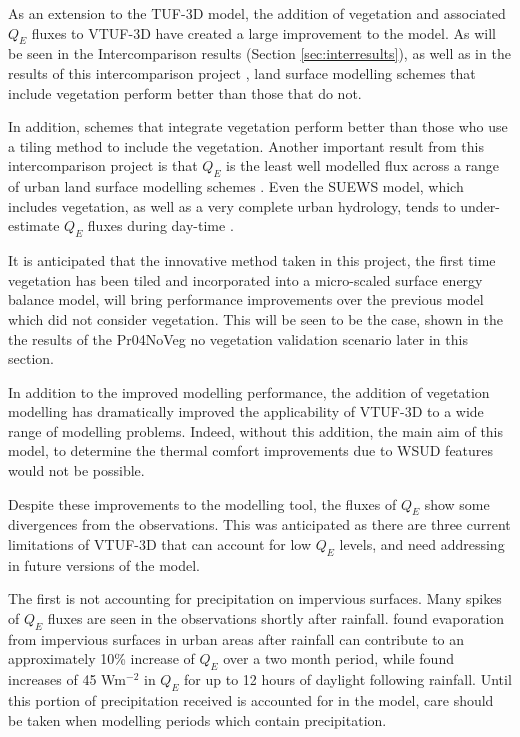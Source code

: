 \documentclass[final,3p,times,authoryear]{elsarticle}
\begin{document}
As an extension to the TUF-3D model, the addition of vegetation and associated $Q_{E}$ fluxes to VTUF-3D have created a large improvement to the model. As will be seen in the Intercomparison results (Section \ref{sec:interresults}), as well as in the results of this intercomparison project \citep{Grimmond2011,Best2012}, land surface modelling schemes that include vegetation perform better than those that do not. 

In addition, schemes that integrate vegetation perform better than those who use a tiling method to include the vegetation. Another important result from this intercomparison project is that $Q_{E}$ is the least well modelled flux across a range of urban land surface modelling schemes \citep{Grimmond2010}. Even the SUEWS model, which includes vegetation, as well as a very complete urban hydrology, tends to under-estimate $Q_{E}$ fluxes during day-time \citep{Jarvi2011}.

It is anticipated that the innovative method taken in this project, the first time vegetation has been tiled and incorporated into a micro-scaled surface energy balance model, will bring performance improvements over the previous model which did not consider vegetation. This will be seen to be the case, shown in the the results of the Pr04NoVeg no vegetation validation scenario later in this section. 

In addition to the improved modelling performance, the addition of vegetation modelling has dramatically improved the applicability of VTUF-3D to a wide range of modelling problems. Indeed, without this addition, the main aim of this model, to determine the thermal comfort improvements due to WSUD features would not be possible. 

Despite these improvements to the modelling tool, the fluxes of $Q_{E}$ show some divergences from the observations. This was anticipated as there are three current limitations of VTUF-3D that can account for low $Q_{E}$ levels, and need addressing in future versions of the model. 

The first is not accounting for precipitation on impervious surfaces. Many spikes of $Q_{E}$ fluxes are seen in the observations shortly after rainfall. \cite{Demuzere2014} found evaporation from impervious surfaces in urban areas after rainfall can contribute to an approximately 10\% increase of $Q_{E}$ over a two month period, while \cite{Wouters2013} found increases of 45 Wm$^{-2}$ in $Q_{E}$ for up to 12 hours of daylight following rainfall. Until this portion of precipitation received is accounted for in the model, care should be taken when modelling periods which contain precipitation.
\end{document}
